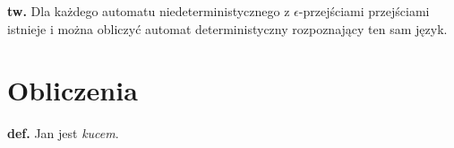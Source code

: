 \documentclass{article}
\begin{document}
	\textbf{tw.} Dla każdego automatu niedeterministycznego z $\epsilon$-przejściami przejściami istnieje i można obliczyć automat deterministyczny rozpoznający ten sam język.





\section{Obliczenia}
	\textbf{def.} Jan jest \textit{kucem}.
\end{document}
